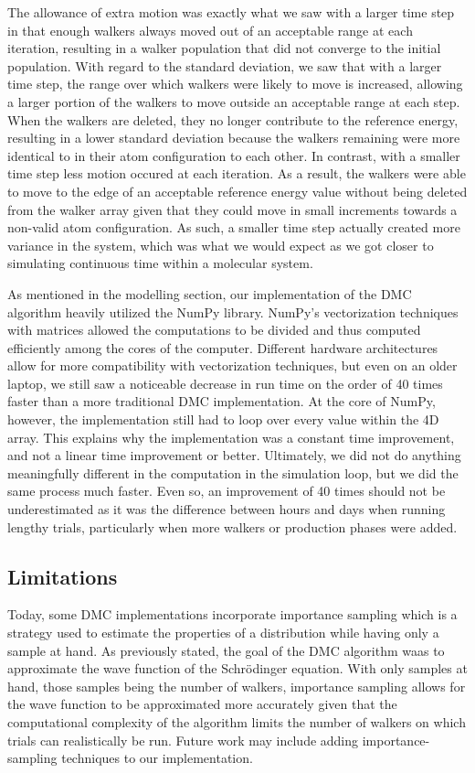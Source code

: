 \documentclass[journal=jacsat,manuscript=article]{achemso}
\begin{document}
The allowance of extra motion was exactly what we saw with a larger time step in that enough walkers always moved out of an acceptable range at each iteration, resulting in a walker population that did not converge to the initial population. With regard to the standard deviation, we saw that with a larger time step, the range over which walkers were likely to move is increased, allowing a larger portion of the walkers to move outside an acceptable range at each step. When the walkers are deleted, they no longer contribute to the reference energy, resulting in a lower standard deviation because the walkers remaining were more identical to in their atom configuration to each other. In contrast, with a smaller time step less motion occured at each iteration. As a result, the walkers were able to move to the edge of an acceptable reference energy value without being deleted from the walker array given that they could move in small increments towards a non-valid atom configuration. As such, a smaller time step actually created more variance in the system, which was what we would expect as we got closer to simulating continuous time within a molecular system. 

As mentioned in the modelling section, our implementation of the DMC algorithm heavily utilized the NumPy library. NumPy’s vectorization techniques with matrices allowed the computations to be divided and thus computed efficiently among the cores of the computer. Different hardware architectures allow for more compatibility with vectorization techniques, but even on an older laptop, we still saw a noticeable decrease in run time on the order of 40 times faster than a more traditional DMC implementation. At the core of NumPy, however, the implementation still had to loop over every value within the 4D array. This explains why the implementation was a constant time improvement, and not a linear time improvement or better. Ultimately, we did not do anything meaningfully different in the computation in the simulation loop, but we did the same process much faster. Even so, an improvement of 40 times should not be underestimated as it was the difference between hours and days when running lengthy trials, particularly when more walkers or production phases were added.

\subsection{Limitations}

Today, some DMC implementations incorporate importance sampling\cite{Vihola2020} which is a strategy used to estimate the properties of a distribution while having only a sample at hand. As previously stated, the goal of the DMC algorithm waas to approximate the wave function of the Schr\"odinger equation. With only samples at hand, those samples being the number of walkers, importance sampling allows for the wave function to be approximated more accurately\cite{Bulik2018} given that the computational complexity of the algorithm limits the number of walkers on which trials can realistically be run. Future work may include adding importance-sampling techniques to our implementation. 
\end{document}
